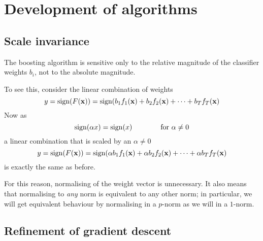 
\chapter{Development of algorithms}

\section{Scale invariance}

The boosting algorithm is sensitive only to the relative magnitude of
the classifier weights $b_i$, not to the absolute magnitude.

To see this, consider the linear combination of weights
%
\begin{equation}
y = \mathrm{sign}(F(\mathbf{x})) = \mathrm{sign}(b_1 f_1(\mathbf{x}) + b_2 f_2(\mathbf{x}) + \cdots +
b_T f_T(\mathbf{x})
\end{equation}
%
Now as
%
\begin{equation}
\mathrm{sign}(\alpha x) = \mathrm{sign}(x) \qquad \qquad \mbox{for $\alpha \neq 0$}
\end{equation}
%
a linear combination that is scaled by an $\alpha \neq 0$
%
\begin{equation}
y = \mathrm{sign}(F(\mathbf{x})) = \mathrm{sign}(\alpha b_1 f_1(\mathbf{x}) + \alpha b_2 f_2(\mathbf{x})
+ \cdots + \alpha b_T f_T(\mathbf{x})
\end{equation}
%
is exactly the same as before.

For this reason, normalising of the weight vector is unnecessary.  It
also means that normalising to \emph{any} norm is equivalent to any
other norm; in particular, we will get equivalent behaviour by
normalising in a $p$-norm as we will in a $1$-norm.

\section{Refinement of gradient descent}

